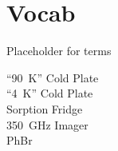 \documentclass[10pt,twocolumn,article]{memoir}
\numberwithin{equation}{chapter}
\newcommand*{\here}{here}
\begin{document}

%






%

%

\chapter{Vocab}

Placeholder for terms

\begin{description}
\item[``90~K'' Cold Plate]
\item[``4~K'' Cold Plate]
\item[Sorption Fridge]
\item[350~GHz Imager]
\item[PhBr]

\end{description}

\printbibliography
\end{document}
